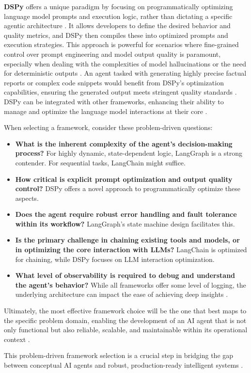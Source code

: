 \textbf{DSPy} offers a unique paradigm by focusing on programmatically optimizing language model prompts and execution logic, rather than dictating a specific agentic architecture \cite{DSPyDocs}. It allows developers to define the desired behavior and quality metrics, and DSPy then compiles these into optimized prompts and execution strategies. This approach is powerful for scenarios where fine-grained control over prompt engineering and model output quality is paramount, especially when dealing with the complexities of model hallucinations or the need for deterministic outputs \cite{Reger2026}. An agent tasked with generating highly precise factual reports or complex code snippets would benefit from DSPy's optimization capabilities, ensuring the generated output meets stringent quality standards \cite{DSPyDocs}. DSPy can be integrated with other frameworks, enhancing their ability to manage and optimize the language model interactions at their core \cite{Reger2026}.

When selecting a framework, consider these problem-driven questions:

\begin{itemize}
  \item \textbf{What is the inherent complexity of the agent's decision-making process?} For highly dynamic, state-dependent logic, LangGraph is a strong contender. For sequential tasks, LangChain might suffice.
  \item \textbf{How critical is explicit prompt optimization and output quality control?} DSPy offers a novel approach to programmatically optimize these aspects.
  \item \textbf{Does the agent require robust error handling and fault tolerance within its workflow?} LangGraph's state machine design facilitates this.
  \item \textbf{Is the primary challenge in chaining existing tools and models, or in optimizing the core interaction with LLMs?} LangChain is optimized for chaining, while DSPy focuses on LLM interaction optimization.
  \item \textbf{What level of observability is required to debug and understand the agent's behavior?} While all frameworks offer some level of logging, the underlying architecture can impact the ease of achieving deep insights \cite{Reger2026}.
\end{itemize}

Ultimately, the most effective framework choice will be the one that best maps to the specific problem domain, enabling the development of an AI agent that is not only functional but also reliable, scalable, and maintainable within its operational context \cite{Reger2026}.

This problem-driven framework selection is a crucial step in bridging the gap between conceptual AI agents and robust, production-ready intelligent systems \cite{Reger2026}.

